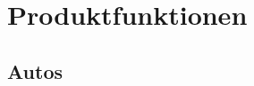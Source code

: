 \documentclass[pflichtenheft.tex]{subfiles}
\begin{document}
\chapter{Produktfunktionen}
\section{Autos}
\end{document}
